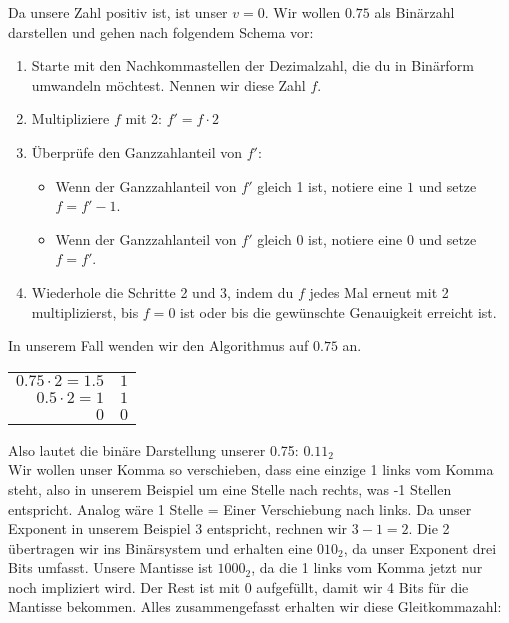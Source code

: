 \documentclass[12pt, letterpaper]{article}
\begin{document}
\noindent Da unsere Zahl positiv ist, ist unser $v = 0$. Wir wollen $0.75$ als Binärzahl darstellen und gehen nach folgendem Schema vor:

\begin{enumerate}
    \item Starte mit den Nachkommastellen der Dezimalzahl, die du in Binärform umwandeln möchtest. Nennen wir diese Zahl $f$.
    
    \item Multipliziere $f$ mit 2:
    $
    f' = f \cdot 2
    $
    
    \item Überprüfe den Ganzzahlanteil von $f'$:
    \begin{itemize}[label=$\circ$]
        \item Wenn der Ganzzahlanteil von $f'$ gleich 1 ist, notiere eine $1$ und setze $f = f' - 1 $.
        \item Wenn der Ganzzahlanteil von $f'$ gleich 0 ist, notiere eine $0$ und setze $f = f'$.
    \end{itemize}
    
    \item Wiederhole die Schritte 2 und 3, indem du $f$ jedes Mal erneut mit 2 multiplizierst, bis $f = 0$ ist oder bis die gewünschte Genauigkeit erreicht ist.
\end{enumerate}

\noindent In unserem Fall wenden wir den Algorithmus auf $0.75$ an.\newline

\begin{tabular}{r|l}
 $0.75 \cdot 2 = 1.5$ & $1$ \\
 $0.5 \cdot 2 = 1$ & $1$ \\
 $0$ & $0$
\end{tabular}\newline\newline

\noindent Also lautet die binäre Darstellung unserer 0.75: $0.11_2$\\
\noindent Wir wollen unser Komma so verschieben, dass eine einzige 1 links vom Komma steht, also in unserem Beispiel um eine Stelle nach rechts, was -1 Stellen entspricht. Analog wäre 1 Stelle = Einer Verschiebung nach links. Da unser Exponent in unserem Beispiel 3 entspricht, rechnen wir $3 - 1 = 2$.
Die 2 übertragen wir ins Binärsystem und erhalten eine $010_2$, da unser Exponent drei Bits umfasst. Unsere Mantisse ist $1000_2$, da die 1 links vom Komma jetzt nur noch impliziert wird. Der Rest ist mit 0 aufgefüllt, damit wir 4 Bits für die Mantisse bekommen. Alles zusammengefasst erhalten wir diese Gleitkommazahl:\\
\end{document}
